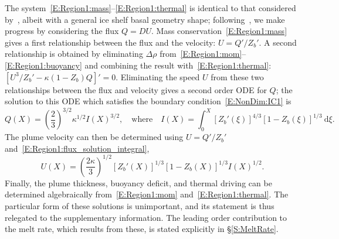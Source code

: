 \documentclass[openacc]{rsproca_new}%
\begin{document}
The system~\eqref{E:Region1:mass}--\eqref{E:Region1:thermal} is identical to that considered by~\cite{Lazeroms2019JPhysOcean}, albeit with a general ice shelf basal geometry shape; following~\cite{Lazeroms2019JPhysOcean}, we make progress by considering the flux $Q= DU$. Mass conservation~\eqref{E:Region1:mass} gives a first relationship between the flux and the velocity: $U = Q'/Z_b'$. A second relationship is obtained by eliminating $\Delta \rho$ from~\eqref{E:Region1:mom}--\eqref{E:Region1:buoyancy} and combining the result with~\eqref{E:Region1:thermal}: $[U^3/Z_b' - \kappa (1 - Z_b)Q]' = 0$. Eliminating the speed $U$ from these two relationships between the flux and velocity gives a second order ODE for $Q$; the solution to this ODE which satisfies the boundary condition~\eqref{E:NonDim:IC1} is 
\begin{equation}\label{E:Region1:flux_solution_integral}
Q(X) =  \left(\frac{2}{3}\right)^{3/2} \kappa^{1/2}I(X)^{3/2}, \quad \text{where} \quad I(X) =  \int_0^X \left[Z_b'(\xi)\right]^{4/3}\left[1 - Z_b(\xi)\right]^{1/3}~\mathrm{d}\xi.
\end{equation}
The plume velocity can then be determined using $U = Q'/Z_b'$ and~\eqref{E:Region1:flux_solution_integral},
\begin{equation}\label{E:Region1:velocity_solution}
U(X) =\left(\frac{2\kappa}{3}\right)^{1/2}\left[Z_b'(X)\right]^{1/3}\left[1 - Z_b(X)\right]^{1/3}I(X)^{1/2}.
\end{equation}
Finally, the plume thickness, buoyancy deficit, and thermal driving can be determined algebraically from~\eqref{E:Region1:mom} and~\eqref{E:Region1:thermal}. The particular form of these solutions is unimportant, and its statement is thus relegated to the supplementary information. The leading order contribution to the melt rate, which results from these, is stated explicitly in \S\ref{S:MeltRate}.
\end{document}
